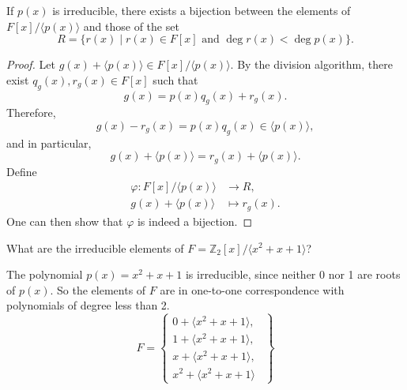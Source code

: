 \begin{proposition}
	If $p(x)$ is irreducible, there exists a bijection between the elements of $F[x]/\langle p(x)\rangle$ and those of the set
	$$R=\{r(x)\mid r(x)\in F[x]\text{ and }\deg r(x)<\deg p(x)\}.$$
\end{proposition}

\begin{proof}
	Let $g(x)+\langle p(x)\rangle\in F[x]/\langle p(x)\rangle$. By the division algorithm, there exist $q_g(x),r_g(x)\in F[x]$ such that
	$$g(x)=p(x)q_g(x)+r_g(x).$$
	Therefore,
	$$g(x)-r_g(x)=p(x)q_g(x)\in\langle p(x)\rangle,$$
	and in particular,
	$$g(x)+\langle p(x)\rangle=r_g(x)+\langle p(x)\rangle.$$
	Define
	\begin{align*}
		\varphi\colon F[x]/\langle p(x)\rangle &\to R,\\
		g(x)+\langle p(x)\rangle &\mapsto r_g(x).
	\end{align*}
	One can then show that $\varphi$ is indeed a bijection.
\end{proof}

\begin{example}
	What are the irreducible elements of $F=\mathbb Z_2[x]/\langle x^2+x+1\rangle$?
	\begin{solution}
		The polynomial $p(x)=x^2+x+1$ is irreducible, since neither 0 nor 1 are roots of $p(x)$. So the elements of $F$ are in one-to-one correspondence with polynomials of degree less than 2.
		$$F=\left\{\begin{array}{r}
		0+\langle x^2+x+1\rangle,\\1+\langle x^2+x+1\rangle,\\x+\langle x^2+x+1\rangle,\\x^2+\langle x^2+x+1\rangle\phantom{,}\end{array}\right\}$$
	\end{solution}
\end{example}
